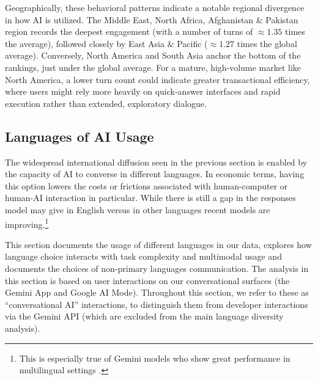 \documentclass[11pt,a4paper]{article}
\begin{document}
Geographically, these behavioral patterns indicate a notable regional divergence in how AI is utilized. The Middle East, North Africa, Afghanistan \& Pakistan region records the deepest engagement (with a number of turns of $\approx 1.35$ times the average), followed closely by East Asia \& Pacific ($\approx 1.27$ times the global average). Conversely, North America and South Asia anchor the bottom of the rankings, just under the global average. For a mature, high-volume market like North America, a lower turn count could indicate greater transactional efficiency, where users might rely more heavily on quick-answer interfaces and rapid execution rather than extended, exploratory dialogue.

\subsection{Languages of AI Usage}

The widespread international diffusion seen in the previous section is enabled by the capacity of AI to converse in different languages. In economic terms, having this option lowers the costs or frictions associated with human-computer \citep{norman1988psychology, card1983psychology} or human-AI interaction in particular. While there is still a gap in the responses model may give in English versus in other languages \citep{ahuja-etal-2023-mega, gupta-etal-2025-found, sirdeshmukh2025multichallengerealisticmultiturnconversation} recent models are improving.\footnote{This is especially true of Gemini models who show great performance in multilingual settings \citep[e.g.,][]{artificialanalysis2026global}.}

This section documents the usage of different languages in our data, explores how language choice interacts with task complexity and multimodal usage and documents the choices of non-primary languages communication. The analysis in this section is based on user interactions on our conversational surfaces (the Gemini App and Google AI Mode). Throughout this section, we refer to these as ``conversational AI'' interactions, to distinguish them from developer interactions via the Gemini API (which are excluded from the main language diversity analysis).
\end{document}
